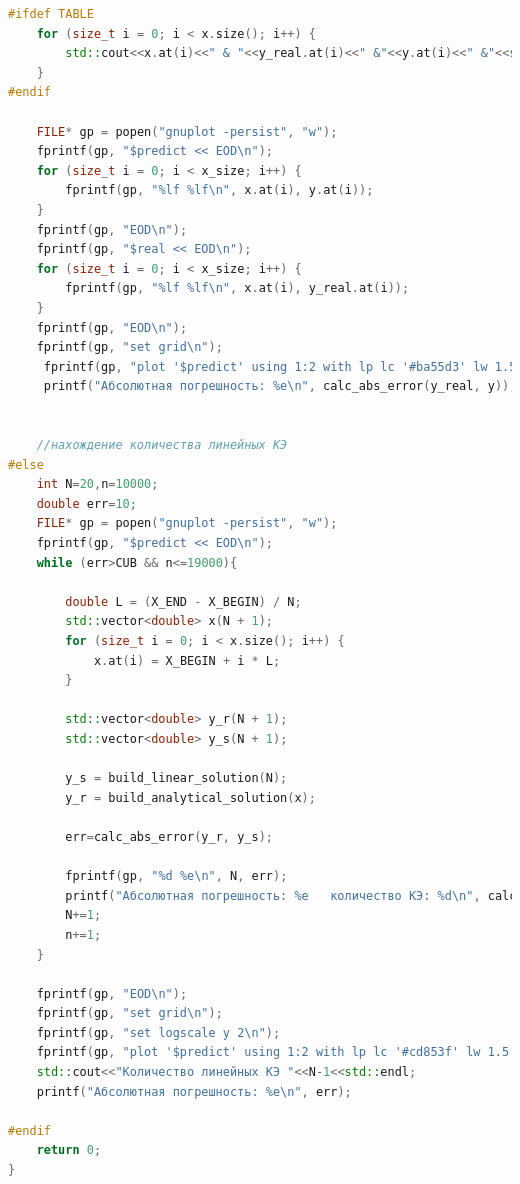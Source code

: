 \begin{lstlisting}[language=c++, label=prog,caption={\textit{Реализация МКЭ}}]
#ifdef TABLE
    for (size_t i = 0; i < x.size(); i++) {
        std::cout<<x.at(i)<<" & "<<y_real.at(i)<<" &"<<y.at(i)<<" &"<<std::fabs(y_real.at(i) - y.at(i))<<"\\\\"<<std::endl;
    }
#endif    

    FILE* gp = popen("gnuplot -persist", "w");
    fprintf(gp, "$predict << EOD\n");
    for (size_t i = 0; i < x_size; i++) {
        fprintf(gp, "%lf %lf\n", x.at(i), y.at(i));
    }
    fprintf(gp, "EOD\n");
    fprintf(gp, "$real << EOD\n");
    for (size_t i = 0; i < x_size; i++) {
        fprintf(gp, "%lf %lf\n", x.at(i), y_real.at(i));
    }
    fprintf(gp, "EOD\n");
    fprintf(gp, "set grid\n");
     fprintf(gp, "plot '$predict' using 1:2 with lp lc '#ba55d3' lw 1.5 pt 7 ps 0.5 title 'МКЭ-решение (%zu КЭ)'," "'$real' using 1:2 with lines lc rgb '#afdafc' lt 1 lw 2 title 'аналитическое решение (%zu КЭ)',\n", ELEMS_NUM, ELEMS_NUM);
     printf("Абсолютная погрешность: %e\n", calc_abs_error(y_real, y));

     
    //нахождение количества линейных КЭ
#else
    int N=20,n=10000;
    double err=10;
    FILE* gp = popen("gnuplot -persist", "w");
    fprintf(gp, "$predict << EOD\n");
    while (err>CUB && n<=19000){
        
        double L = (X_END - X_BEGIN) / N;
        std::vector<double> x(N + 1);
        for (size_t i = 0; i < x.size(); i++) {
            x.at(i) = X_BEGIN + i * L;
        }
        
        std::vector<double> y_r(N + 1);
        std::vector<double> y_s(N + 1);
        
        y_s = build_linear_solution(N);
        y_r = build_analytical_solution(x);
        
        err=calc_abs_error(y_r, y_s);
        
        fprintf(gp, "%d %e\n", N, err);
        printf("Абсолютная погрешность: %e   количество КЭ: %d\n", calc_abs_error(y_r, y_s), N);
        N+=1;
        n+=1;
    }
    
    fprintf(gp, "EOD\n");
    fprintf(gp, "set grid\n");
    fprintf(gp, "set logscale y 2\n");
    fprintf(gp, "plot '$predict' using 1:2 with lp lc '#cd853f' lw 1.5 pt 7 ps 0.5 title 'Абсолютная погрешность',\n" );
    std::cout<<"Количество линейных КЭ "<<N-1<<std::endl;
    printf("Абсолютная погрешность: %e\n", err);

#endif 
    return 0;
}

\end{lstlisting}
